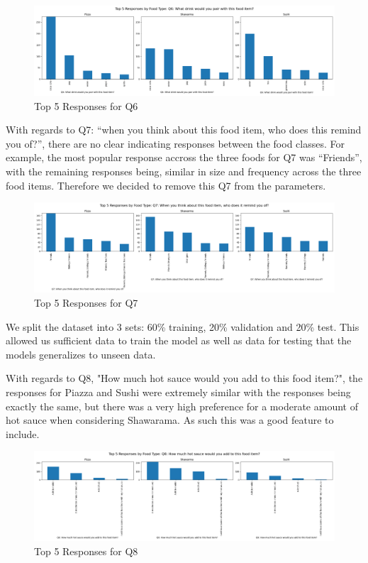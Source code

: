 \begin{figure}[ht]
    \centerline{\includegraphics[width=\columnwidth]{data/top_5_responses_Q6.png}}
    \caption{Top 5 Responses for Q6}
    \label{f:q6}
\end{figure}

With regards to Q7: “when you think about this food item, who does this remind you of?”, there are no clear indicating responses
between the food classes. For example, the most popular response accross the three foods for Q7 was “Friends”, with the remaining
responses being, similar in size and frequency across the three food items. Therefore we decided to remove this Q7 from the parameters. 

\begin{figure}[ht]
    \centerline{\includegraphics[width=\columnwidth]{data/top_5_responses_Q7.png}}
    \caption{Top 5 Responses for Q7}
    \label{f:q7}
\end{figure}

We split the dataset into 3 sets: 60\% training, 20\% validation and 20\% test. This allowed us sufficient data to train the model as well as data for testing that the models generalizes to unseen data.

With regards to Q8, "How much hot sauce would you add to this food item?", the responses for Piazza and Sushi were extremely similar with the responses being exactly the same, but there was a very
high preference for a moderate amount of hot sauce when considering Shawarama. As such this was a good feature to include.


\begin{figure}[ht]
    \centerline{\includegraphics[width=\columnwidth]{data/top_5_responses_Q8.png}}
    \caption{Top 5 Responses for Q8}
    \label{f:q8}
\end{figure}




